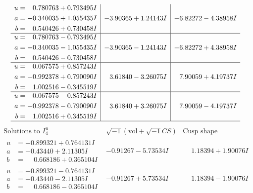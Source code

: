 \documentclass[1p]{elsarticle_modified}
\theoremstyle{definition}
\newcommand{\I}{\sqrt{-1}}
\begin{document}
$$\begin{array}{c|c|c}
\begin{aligned}
u &= \phantom{-}0.780763 + 0.793495 I \\
a &= -0.340035 + 1.055435 I \\
b &= \phantom{-}0.540426 + 0.730458 I\end{aligned}
 & -3.90365 + 1.24143 I & -6.82272 - 4.38958 I \\ \hline\begin{aligned}
u &= \phantom{-}0.780763 - 0.793495 I \\
a &= -0.340035 - 1.055435 I \\
b &= \phantom{-}0.540426 - 0.730458 I\end{aligned}
 & -3.90365 - 1.24143 I & -6.82272 + 4.38958 I \\ \hline\begin{aligned}
u &= \phantom{-}0.067575 + 0.857243 I \\
a &= -0.992378 + 0.790090 I \\
b &= \phantom{-}1.002516 - 0.345519 I\end{aligned}
 & \phantom{-}3.61840 - 3.26075 I & \phantom{-}7.90059 + 4.19737 I \\ \hline\begin{aligned}
u &= \phantom{-}0.067575 - 0.857243 I \\
a &= -0.992378 - 0.790090 I \\
b &= \phantom{-}1.002516 + 0.345519 I\end{aligned}
 & \phantom{-}3.61840 + 3.26075 I & \phantom{-}7.90059 - 4.19737 I\\
 \hline 
 \end{array}$$\newpage$$\begin{array}{c|c|c}  
\text{Solutions to }I^u_{4}& \I (\text{vol} + \sqrt{-1}CS) & \text{Cusp shape}\\
 \hline 
\begin{aligned}
u &= -0.899321 + 0.764131 I \\
a &= -0.43440 + 2.11305 I \\
b &= \phantom{-}0.668186 + 0.365104 I\end{aligned}
 & -0.91267 - 5.73534 I & \phantom{-}1.18394 + 1.90076 I \\ \hline\begin{aligned}
u &= -0.899321 - 0.764131 I \\
a &= -0.43440 - 2.11305 I \\
b &= \phantom{-}0.668186 - 0.365104 I\end{aligned}
 & -0.91267 + 5.73534 I & \phantom{-}1.18394 - 1.90076 I \\ \hline\begin{aligned}

\end{aligned}
\end{array}$$
\end{document}
